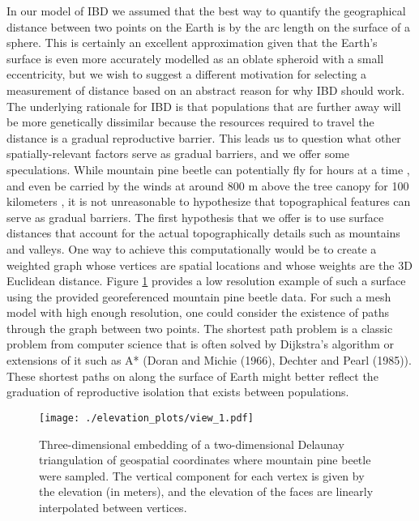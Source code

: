 \documentclass[
  letterpaper,
  DIV=11,
  numbers=noendperiod]{scrreprt}
\begin{document}
In our model of IBD we assumed that the best way to quantify the
geographical distance between two points on the Earth is by the arc
length on the surface of a sphere. This is certainly an excellent
approximation given that the Earth's surface is even more accurately
modelled as an oblate spheroid with a small eccentricity, but we wish to
suggest a different motivation for selecting a measurement of distance
based on an abstract reason for why IBD should work. The underlying
rationale for IBD is that populations that are further away will be more
genetically dissimilar because the resources required to travel the
distance is a gradual reproductive barrier. This leads us to question
what other spatially-relevant factors serve as gradual barriers, and we
offer some speculations. While mountain pine beetle can potentially fly
for hours at a time \cite{Evenden2014}, and even be carried by the winds
at around 800 m above the tree canopy for 100 kilometers
\cite{Jackson2008}, it is not unreasonable to hypothesize that
topographical features can serve as gradual barriers. The first
hypothesis that we offer is to use surface distances that account for
the actual topographically details such as mountains and valleys. One
way to achieve this computationally would be to create a weighted graph
whose vertices are spatial locations and whose weights are the 3D
Euclidean distance. Figure \ref{fig:elevationsurface} provides a low
resolution example of such a surface using the provided georeferenced
mountain pine beetle data. For such a mesh model with high enough
resolution, one could consider the existence of paths through the graph
between two points. The shortest path problem is a classic problem from
computer science that is often solved by Dijkstra's algorithm
\cite{Dijkstra1959} or extensions of it such as A* (Doran and Michie
(1966), Dechter and Pearl (1985)). These shortest paths on along the
surface of Earth might better reflect the graduation of reproductive
isolation that exists between populations.

\begin{figure}
    \centering
    \texttt{[image: ./elevation\_plots/view\_1.pdf]}
    \caption{Three-dimensional embedding of a two-dimensional Delaunay triangulation of geospatial coordinates where mountain pine beetle were sampled. The vertical component for each vertex is given by the elevation (in meters), and the elevation of the faces are linearly interpolated between vertices.}
    \label{fig:elevationsurface}
\end{figure}
\end{document}
